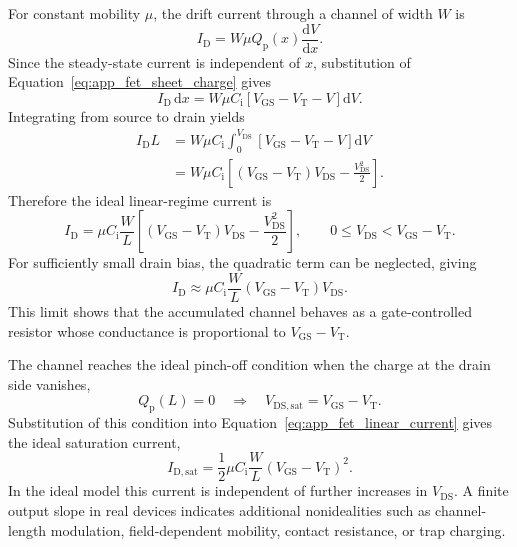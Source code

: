 \begin{appendix}
For constant mobility $\mu$, the drift current through a channel of width $W$ is
\begin{equation}
    I_\mathrm{D}
    =W\mu Q_\mathrm{p}(x)\frac{\mathrm{d}V}{\mathrm{d}x}.
    \label{eq:app_fet_local_current}
\end{equation}
Since the steady-state current is independent of $x$, substitution of
Equation~\eqref{eq:app_fet_sheet_charge} gives
\begin{equation}
    I_\mathrm{D}\,\mathrm{d}x
    =W\mu C_\mathrm{i}
    \left[V_\mathrm{GS}-V_\mathrm{T}-V\right]\mathrm{d}V.
    \label{eq:app_fet_separated_current}
\end{equation}
Integrating from source to drain yields
\begin{align}
    I_\mathrm{D}L
    &=W\mu C_\mathrm{i}
    \int_0^{V_\mathrm{DS}}
    \left[V_\mathrm{GS}-V_\mathrm{T}-V\right]\mathrm{d}V \\
    &=W\mu C_\mathrm{i}
    \left[
        \left(V_\mathrm{GS}-V_\mathrm{T}\right)V_\mathrm{DS}
        -\frac{V_\mathrm{DS}^2}{2}
    \right].
    \label{eq:app_fet_integrated_current}
\end{align}
Therefore the ideal linear-regime current is
\begin{equation}
    I_\mathrm{D}
    =\mu C_\mathrm{i}\frac{W}{L}
    \left[
        \left(V_\mathrm{GS}-V_\mathrm{T}\right)V_\mathrm{DS}
        -\frac{V_\mathrm{DS}^2}{2}
    \right],
    \qquad
    0\leq V_\mathrm{DS}<V_\mathrm{GS}-V_\mathrm{T}.
    \label{eq:app_fet_linear_current}
\end{equation}
For sufficiently small drain bias, the quadratic term can be neglected, giving
\begin{equation}
    I_\mathrm{D}
    \approx \mu C_\mathrm{i}\frac{W}{L}
    \left(V_\mathrm{GS}-V_\mathrm{T}\right)V_\mathrm{DS}.
    \label{eq:app_fet_small_vds_current}
\end{equation}
This limit shows that the accumulated channel behaves as a gate-controlled
resistor whose conductance is proportional to $V_\mathrm{GS}-V_\mathrm{T}$.

The channel reaches the ideal pinch-off condition when the charge at the drain
side vanishes,
\begin{equation}
    Q_\mathrm{p}(L)=0
    \quad\Rightarrow\quad
    V_\mathrm{DS,sat}=V_\mathrm{GS}-V_\mathrm{T}.
    \label{eq:app_fet_pinch_off_condition}
\end{equation}
Substitution of this condition into Equation~\eqref{eq:app_fet_linear_current}
gives the ideal saturation current,
\begin{equation}
    I_\mathrm{D,sat}
    =\frac{1}{2}\mu C_\mathrm{i}\frac{W}{L}
    \left(V_\mathrm{GS}-V_\mathrm{T}\right)^2.
    \label{eq:app_fet_saturation_current}
\end{equation}
In the ideal model this current is independent of further increases in
$V_\mathrm{DS}$. A finite output slope in real devices indicates additional
nonidealities such as channel-length modulation, field-dependent mobility,
contact resistance, or trap charging.


\end{appendix}
